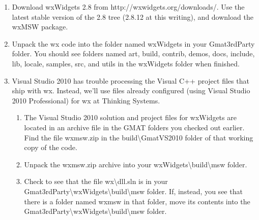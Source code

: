\documentclass[letterpaper,10pt]{article}%
\begin{document}
\begin{enumerate}
\item Download wxWidgets 2.8 from http://wxwidgets.org/downloads/.  Use the latest stable version of the 2.8 tree (2.8.12 at this writing), and download the wxMSW package.
\item Unpack the wx code into the folder named wxWidgets in your Gmat3rdParty folder.  You should see folders named art, build, contrib, demos, docs, include, lib, locale, samples, src, and utils in the wxWidgets folder when finished.
\item Visual Studio 2010 has trouble processing the Visual C++ project files that ship with wx.  Instead, we'll use files already configured (using Visual Studio 2010 Professional) for wx at Thinking Systems. 
\begin{enumerate}
\item The Visual Studio 2010 solution and project files for wxWidgets are located in an archive file in the GMAT folders you checked out earlier.  Find the file wxmsw.zip in the build\textbackslash GmatVS2010 folder of that working copy of the code.
\item Unpack the wxmsw.zip archive into your wxWidgets\textbackslash build\textbackslash msw folder.
\item Check to see that the file wx\textbackslash dll.sln is in your Gmat3rdParty\textbackslash wxWidgets\textbackslash build\textbackslash msw folder.  If, instead, you see that there is a folder named wxmsw in that folder, move its contents into the Gmat3rdParty\textbackslash wxWidgets\textbackslash build\textbackslash msw folder. 
\end{enumerate}
 
\end{enumerate}
\end{document}
